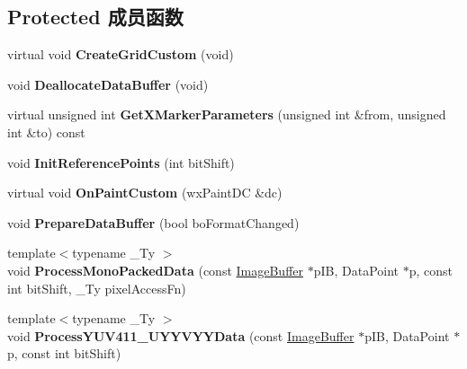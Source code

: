 \subsection*{Protected 成员函数}
\begin{DoxyCompactItemize}
\item 
\hypertarget{class_vector_scope_canvas_aa75b08476075bf8f65cc9d0758ce865a}{virtual void {\bfseries Create\+Grid\+Custom} (void)}\label{class_vector_scope_canvas_aa75b08476075bf8f65cc9d0758ce865a}

\item 
\hypertarget{class_vector_scope_canvas_a1dcba95361ba881e92f888edb560f88c}{void {\bfseries Deallocate\+Data\+Buffer} (void)}\label{class_vector_scope_canvas_a1dcba95361ba881e92f888edb560f88c}

\item 
\hypertarget{class_vector_scope_canvas_a01caf77f36552844a224bd2dfe32f407}{virtual unsigned int {\bfseries Get\+X\+Marker\+Parameters} (unsigned int \&from, unsigned int \&to) const }\label{class_vector_scope_canvas_a01caf77f36552844a224bd2dfe32f407}

\item 
\hypertarget{class_vector_scope_canvas_a83a0bdb1701600a836e2002d2b45a6c2}{void {\bfseries Init\+Reference\+Points} (int bit\+Shift)}\label{class_vector_scope_canvas_a83a0bdb1701600a836e2002d2b45a6c2}

\item 
\hypertarget{class_vector_scope_canvas_a8043f966050532088b291ffefec76489}{virtual void {\bfseries On\+Paint\+Custom} (wx\+Paint\+D\+C \&dc)}\label{class_vector_scope_canvas_a8043f966050532088b291ffefec76489}

\item 
\hypertarget{class_vector_scope_canvas_a5b9d42011d519c06c60d18784e4b8fa2}{void {\bfseries Prepare\+Data\+Buffer} (bool bo\+Format\+Changed)}\label{class_vector_scope_canvas_a5b9d42011d519c06c60d18784e4b8fa2}

\item 
\hypertarget{class_vector_scope_canvas_aefe92f844315afa1bc3dcfb35e527841}{{\footnotesize template$<$typename \+\_\+\+Ty $>$ }\\void {\bfseries Process\+Mono\+Packed\+Data} (const \hyperlink{struct_image_buffer}{Image\+Buffer} $\ast$p\+I\+B, Data\+Point $\ast$p, const int bit\+Shift, \+\_\+\+Ty pixel\+Access\+Fn)}\label{class_vector_scope_canvas_aefe92f844315afa1bc3dcfb35e527841}

\item 
\hypertarget{class_vector_scope_canvas_a1f432e2bd5b85780cceff736bf8d7f95}{{\footnotesize template$<$typename \+\_\+\+Ty $>$ }\\void {\bfseries Process\+Y\+U\+V411\+\_\+\+U\+Y\+Y\+V\+Y\+Y\+Data} (const \hyperlink{struct_image_buffer}{Image\+Buffer} $\ast$p\+I\+B, Data\+Point $\ast$p, const int bit\+Shift)}\label{class_vector_scope_canvas_a1f432e2bd5b85780cceff736bf8d7f95}


\end{DoxyCompactItemize}
